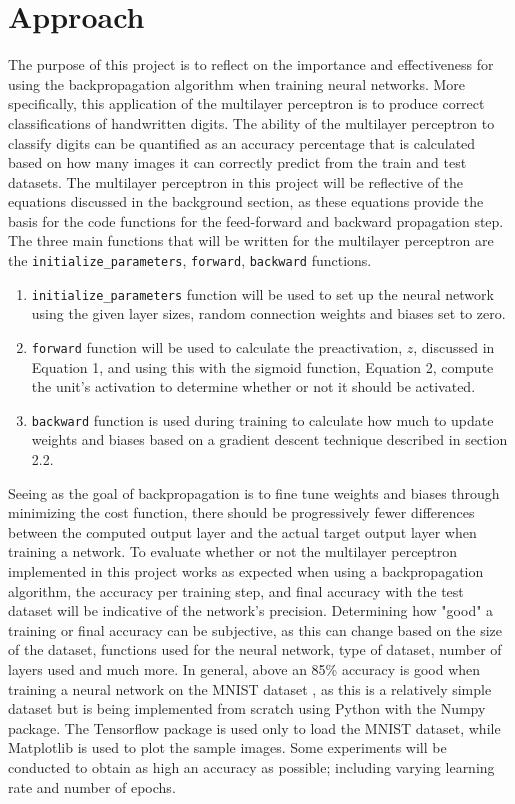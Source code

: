 \documentclass[twocolumn]{article}
\begin{document}
\section{Approach}
The purpose of this project is to reflect on the importance and effectiveness for using the backpropagation algorithm when training neural networks. More specifically, this application of the multilayer perceptron is to produce correct classifications of handwritten digits. The ability of the multilayer perceptron to classify digits can be quantified as an accuracy percentage that is calculated based on how many images it can correctly predict from the train and test datasets. The multilayer perceptron in this project will be reflective of the equations discussed in the background section, as these equations provide the basis for the code functions for the feed-forward and backward propagation step. The three main functions that will be written for the multilayer perceptron are the \texttt{initialize\_parameters}, \texttt{forward}, \texttt{backward} functions. 
\begin{enumerate}
    \item \texttt{initialize\_parameters} function will be used to set up the neural network using the given layer sizes, random connection weights and biases set to zero.
    \item \texttt{forward} function will be used to calculate the preactivation, $z$, discussed in Equation 1, and using this with the sigmoid function, Equation 2, compute the unit's activation to determine whether or not it should be activated. 
    \item \texttt{backward} function is used during training to calculate how much to update weights and biases based on a gradient descent technique described in section 2.2. 
\end{enumerate}
Seeing as the goal of backpropagation is to fine tune weights and biases through minimizing the cost function, there should be progressively fewer differences between the computed output layer and the actual target output layer when training a network. \cite{nielsen1}  To evaluate whether or not the multilayer perceptron implemented in this project works as expected when using a backpropagation algorithm, the accuracy per training step, and final accuracy with the test dataset will be indicative of the network's precision. Determining how "good" a training or final accuracy can be subjective, as this can change based on the size of the dataset, functions used for the neural network, type of dataset, number of layers used and much more. In general, above an 85\% accuracy is good when training a neural network on the MNIST dataset \cite{lecun2010mnist}, as this is a relatively simple dataset but is being implemented from scratch using Python \cite{5python} with the Numpy \cite{harris2020array} package. The Tensorflow package \cite{tensorflow2015-whitepaper} is used only to load the MNIST dataset, while Matplotlib \cite{Hunter:2007} is used to plot the sample images. Some experiments will be conducted to obtain as high an accuracy as possible; including varying learning rate and number of epochs.
\end{document}
